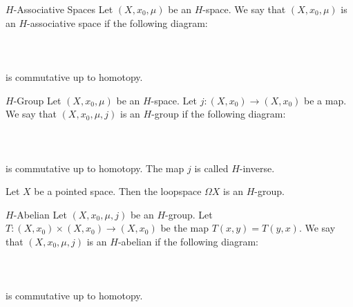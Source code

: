 \documentclass[a4paper]{article}
\begin{document}
\begin{defn}{$H$-Associative Spaces}{} Let $(X,x_0,\mu)$ be an $H$-space. We say that $(X,x_0,\mu)$ is an $H$-associative space if the following diagram: \\~\\
\\~\\
is commutative up to homotopy. 
\end{defn}

\begin{defn}{$H$-Group}{} Let $(X,x_0,\mu)$ be an $H$-space. Let $j:(X,x_0)\to(X,x_0)$ be a map. We say that $(X,x_0,\mu,j)$ is an $H$-group if the following diagram: \\~\\
\\~\\
is commutative up to homotopy. The map $j$ is called $H$-inverse. 
\end{defn}

\begin{eg}{}{} Let $X$ be a pointed space. Then the loopspace $\Omega X$ is an $H$-group. 
\end{eg}

\begin{defn}{$H$-Abelian}{} Let $(X,x_0,\mu,j)$ be an $H$-group. Let $T:(X,x_0)\times(X,x_0)\to(X,x_0)$ be the map $T(x,y)=T(y,x)$. We say that $(X,x_0,\mu,j)$ is an $H$-abelian if the following diagram: \\~\\
\\~\\
is commutative up to homotopy. 
\end{defn}
\end{document}
